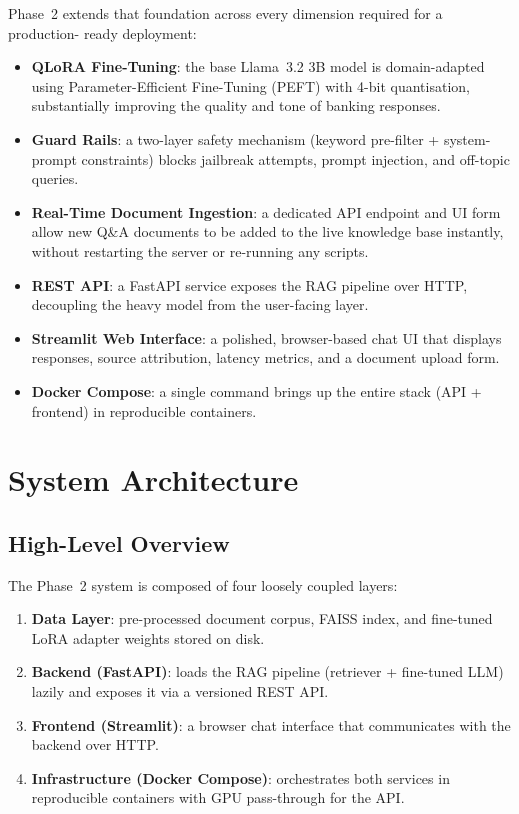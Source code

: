 \documentclass[12pt,a4paper]{article}
\begin{document}
Phase~2 extends that foundation across every dimension required for a production-
ready deployment:

\begin{itemize}
  \item \textbf{QLoRA Fine-Tuning}: the base Llama~3.2 3B model is domain-adapted
        using Parameter-Efficient Fine-Tuning (PEFT) with 4-bit quantisation,
        substantially improving the quality and tone of banking responses.
  \item \textbf{Guard Rails}: a two-layer safety mechanism (keyword pre-filter +
        system-prompt constraints) blocks jailbreak attempts, prompt injection,
        and off-topic queries.
  \item \textbf{Real-Time Document Ingestion}: a dedicated API endpoint and UI form
        allow new Q\&A documents to be added to the live knowledge base instantly,
        without restarting the server or re-running any scripts.
  \item \textbf{REST API}: a FastAPI service exposes the RAG pipeline over HTTP,
        decoupling the heavy model from the user-facing layer.
  \item \textbf{Streamlit Web Interface}: a polished, browser-based chat UI that
        displays responses, source attribution, latency metrics, and a document
        upload form.
  \item \textbf{Docker Compose}: a single command brings up the entire stack
        (API + frontend) in reproducible containers.
\end{itemize}

\section{System Architecture}

\subsection{High-Level Overview}

The Phase~2 system is composed of four loosely coupled layers:

\begin{enumerate}[leftmargin=2em]
  \item \textbf{Data Layer}: pre-processed document corpus, FAISS index, and
        fine-tuned LoRA adapter weights stored on disk.
  \item \textbf{Backend (FastAPI)}: loads the RAG pipeline (retriever + fine-tuned
        LLM) lazily and exposes it via a versioned REST API.
  \item \textbf{Frontend (Streamlit)}: a browser chat interface that communicates
        with the backend over HTTP.
  \item \textbf{Infrastructure (Docker Compose)}: orchestrates both services in
        reproducible containers with GPU pass-through for the API.
\end{enumerate}
\end{document}
